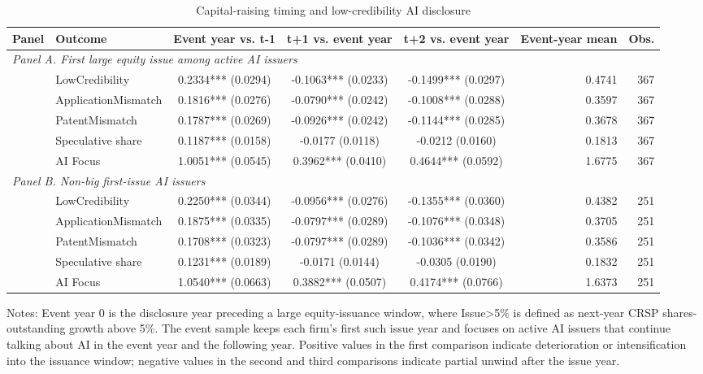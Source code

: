 \begin{table}[!htbp]
\centering
\caption{Capital-raising timing and low-credibility AI disclosure}
\small
\begin{tabular}{llcccrr}
\hline
Panel & Outcome & Event year vs. t-1 & t+1 vs. event year & t+2 vs. event year & Event-year mean & Obs. \\
\hline
\multicolumn{7}{l}{\textit{Panel A. First large equity issue among active AI issuers}} \\
 & LowCredibility & 0.2334*** (0.0294) & -0.1063*** (0.0233) & -0.1499*** (0.0297) & 0.4741 & 367 \\
 & ApplicationMismatch & 0.1816*** (0.0276) & -0.0790*** (0.0242) & -0.1008*** (0.0288) & 0.3597 & 367 \\
 & PatentMismatch & 0.1787*** (0.0269) & -0.0926*** (0.0242) & -0.1144*** (0.0285) & 0.3678 & 367 \\
 & Speculative share & 0.1187*** (0.0158) & -0.0177 (0.0118) & -0.0212 (0.0160) & 0.1813 & 367 \\
 & AI Focus & 1.0051*** (0.0545) & 0.3962*** (0.0410) & 0.4644*** (0.0592) & 1.6775 & 367 \\
\multicolumn{7}{l}{\textit{Panel B. Non-big first-issue AI issuers}} \\
 & LowCredibility & 0.2250*** (0.0344) & -0.0956*** (0.0276) & -0.1355*** (0.0360) & 0.4382 & 251 \\
 & ApplicationMismatch & 0.1875*** (0.0335) & -0.0797*** (0.0289) & -0.1076*** (0.0348) & 0.3705 & 251 \\
 & PatentMismatch & 0.1708*** (0.0323) & -0.0797*** (0.0289) & -0.1036*** (0.0342) & 0.3586 & 251 \\
 & Speculative share & 0.1231*** (0.0189) & -0.0171 (0.0144) & -0.0305 (0.0190) & 0.1832 & 251 \\
 & AI Focus & 1.0540*** (0.0663) & 0.3882*** (0.0507) & 0.4174*** (0.0766) & 1.6373 & 251 \\
\hline
\end{tabular}
\begin{flushleft}
\footnotesize Notes: Event year 0 is the disclosure year preceding a large equity-issuance window, where Issue>5\% is defined as next-year CRSP shares-outstanding growth above 5\%. The event sample keeps each firm's first such issue year and focuses on active AI issuers that continue talking about AI in the event year and the following year. Positive values in the first comparison indicate deterioration or intensification into the issuance window; negative values in the second and third comparisons indicate partial unwind after the issue year.
\end{flushleft}
\end{table}
